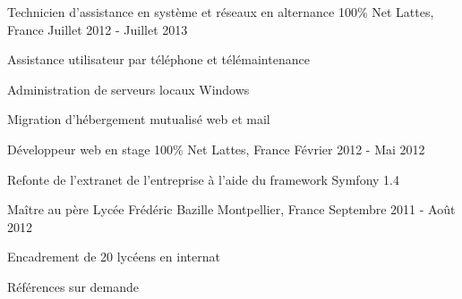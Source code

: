 \begin{cventries}
  \cventry
    {Technicien d'assistance en système et réseaux en alternance} %
    {100\% Net} %
    {Lattes, France} %
    {Juillet 2012 - Juillet 2013} %
    {
      \begin{cvitems} %
        \item {Assistance utilisateur par téléphone et télémaintenance}
        \item {Administration de serveurs locaux Windows}
        \item {Migration d'hébergement mutualisé web et mail}
      \end{cvitems}
    }

  \cventry
    {Développeur web en stage} %
    {100\% Net} %
    {Lattes, France} %
    {Février 2012 - Mai 2012} %
    {
      \begin{cvitems} %
        \item {Refonte de l'extranet de l'entreprise à l'aide du framework Symfony 1.4}
      \end{cvitems}
    }

  \cventry
    {Maître au père} %
    {Lycée Frédéric Bazille} %
    {Montpellier, France} %
    {Septembre 2011 - Août 2012} %
    {
      \begin{cvitems} %
        \item {Encadrement de 20 lycéens en internat}
      \end{cvitems}
    }

  \cventry
  {} %
  {} %
  {} %
  {} %
  {Références sur demande}

\end{cventries}
